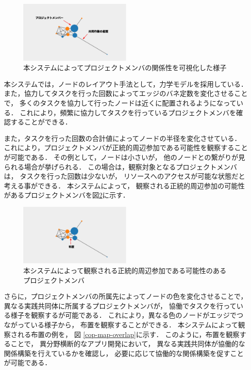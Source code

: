 \begin{figure}[h]
  \centering
  \includegraphics[width=0.5\textwidth]{img/cop-map-graph.eps}
  \caption{本システムによってプロジェクトメンバの関係性を可視化した様子}
  \label{cop-map-graph}
\end{figure}

本システムでは，ノードのレイアウト手法として，力学モデルを採用している．
また，協力してタスクを行った回数によってエッジのバネ定数を変化させることで，
多くのタスクを協力して行ったノードは近くに配置されるようになっている．
これにより，頻繁に協力してタスクを行っているプロジェクトメンバを確認することができる．

また，タスクを行った回数の合計値によってノードの半径を変化させている．
これにより，プロジェクトメンバが正統的周辺参加である可能性を観察することが可能である．
その例として，ノードは小さいが，
他のノードとの繋がりが見られる場合が挙げられる．
この場合は，観察対象となるプロジェクトメンバは，
タスクを行った回数は少ないが，
リソースへのアクセスが可能な状態だと考える事ができる．
本システムによって，
観察される正統的周辺参加の可能性があるプロジェクトメンバを図\ref{cop-map-lpp}に示す．

\begin{figure}[h]
  \centering
  \includegraphics[width=0.5\textwidth]{img/cop-map-lpp.eps}
  \caption{本システムによって観察される正統的周辺参加である可能性のあるプロジェクトメンバ}
  \label{cop-map-lpp}
\end{figure}

さらに，プロジェクトメンバの所属先によってノードの色を変化させることで，
異なる実践共同体に所属するプロジェクトメンバが，
協働でタスクを行っている様子を観察するが可能である．
これにより，異なる色のノードがエッジでつながっている様子から，
布置を観察することができる．
本システムによって観察される布置の例を，
図 \ref{cop-map-overlap}に示す．
このように，布置を観察することで，
異分野横断的なアプリ開発において，
異なる実践共同体が協働的な関係構築を行えているかを確認し，
必要に応じて協働的な関係構築を促すことが可能である．

